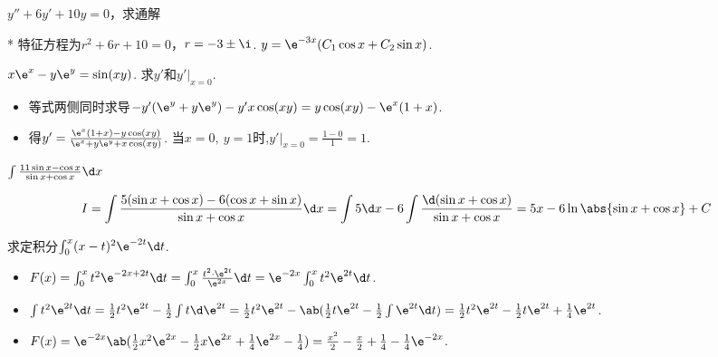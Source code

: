 \begin{problem}
    $y''+6y'+10y=0$，求通解
\end{problem}
\begin{solution}*
    特征方程为$r^2+6r+10=0$，$r=-3\pm\i$. $y=\e^{-3x}(C_1\cos x+C_2\sin x)$.
\end{solution}

\begin{problem}
    $x\e^x-y\e^y=\sin(xy)$. 求$y'$和$y'\Big|_{x=0}$.
\end{problem}
\begin{solution}
\begin{itemize}
    \item 等式两侧同时求导$-y'(\e^y+y\e^y)-y'x\cos(xy)=y\cos(xy)-\e^x(1+x)$.
    \item 得$y'=\frac{\e^x(1+x)-y\cos(xy)}{\e^x+y\e^y+x\cos(xy)}$. 当$x=0,\ y=1$时,$y'\Big|_{x=0}=\frac{1-0}{1}=1$.
\end{itemize}
\end{solution}

\begin{problem}
    $\int\frac{11\sin x-\cos x}{\sin x+\cos x}\d x$
\end{problem}
\begin{solution}
    \[I=\int\frac{5(\sin x+\cos x)-6(\cos x+\sin x)}{\sin x+\cos x}\d x=\int 5\d x-6\int\frac{\d(\sin x+\cos x)}{\sin x+\cos x}=5x-6\ln\abs{\sin x+\cos x}+C\]
\end{solution}

\begin{problem}
    求定积分$\int_0^x(x-t)^2\e^{-2t}\d t$.
\end{problem}
\begin{solution}
\begin{itemize}
    \item $F(x)=\int_0^xt^2\e^{-2x+2t}\d t=\int_0^x\frac{t^2\cdot\e^{2t}}{\e^{2x}}\d t=\e^{-2x}\int_0^x t^2\e^{2t}\d t$.
    \item $\int t^2\e^{2t}\d t=\frac12t^2\e^{2t}-\frac12\int t\d\e^{2t}=\frac12t^2\e^{2t}-\ab(\frac12t\e^{2t}-\frac12\int\e^{2t}\d t)=\frac12t^2\e^{2t}-\frac12t\e^{2t}+\frac14\e^{2t}$.
    \item $F(x)=\e^{-2x}\ab(\frac12x^2\e^{2x}-\frac12x\e^{2x}+\frac14\e^{2x}-\frac14)=\frac{x^2}{2}-\frac x2+\frac14-\frac14\e^{-2x}$.
\end{itemize}
\end{solution}


